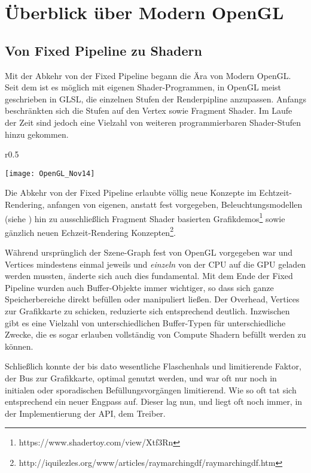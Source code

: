\chapter{Überblick über Modern OpenGL}
\label{chap:modern-opengl}

\section{Von Fixed Pipeline zu Shadern}
Mit der Abkehr von der Fixed Pipeline begann die Ära von Modern OpenGL. Seit dem ist es möglich mit eigenen Shader-Programmen, in OpenGL meist geschrieben in GLSL, die einzelnen Stufen der Renderpipline anzupassen. Anfangs beschränkten sich die Stufen auf den Vertex sowie Fragment Shader. Im Laufe der Zeit sind jedoch eine Vielzahl von weiteren programmierbaren Shader-Stufen hinzu gekommen.

\begin{wrapfigure}{r}{0.5\linewidth}
\begin{centering}
	\texttt{[image: OpenGL\_Nov14]}
\end{centering}
\end{wrapfigure}

Die Abkehr von der Fixed Pipeline erlaubte völlig neue Konzepte im Echtzeit-Rendering, anfangen von eigenen, anstatt fest vorgegeben, Beleuchtungsmodellen (siehe ) hin zu ausschließlich Fragment Shader basierten Grafikdemos\footnote{https://www.shadertoy.com/view/Xtf3Rn} sowie gänzlich neuen Echzeit-Rendering Konzepten\footnote{http://iquilezles.org/www/articles/raymarchingdf/raymarchingdf.htm}.

Während ursprünglich der Szene-Graph fest von OpenGL vorgegeben war und Vertices mindestens einmal jeweils und \textit{einzeln} von der CPU auf die GPU geladen werden mussten, änderte sich auch dies fundamental. Mit dem Ende der Fixed Pipeline wurden auch Buffer-Objekte immer wichtiger, so dass sich ganze Speicherbereiche direkt befüllen oder manipuliert ließen. Der Overhead, Vertices zur Grafikkarte zu schicken, reduzierte sich entsprechend deutlich. Inzwischen gibt es eine Vielzahl von unterschiedlichen Buffer-Typen für unterschiedliche Zwecke, die es sogar erlauben vollständig von Compute Shadern befüllt werden zu können.

Schließlich konnte der bis dato wesentliche Flaschenhals und limitierende Faktor, der Bus zur Grafikkarte, optimal genutzt werden, und war oft nur noch in initialen oder sporadischen Befüllungsvorgängen limitierend. Wie so oft tat sich entsprechend ein neuer Engpass auf. Dieser lag nun, und liegt oft noch immer, in der Implementierung der API, dem Treiber.

